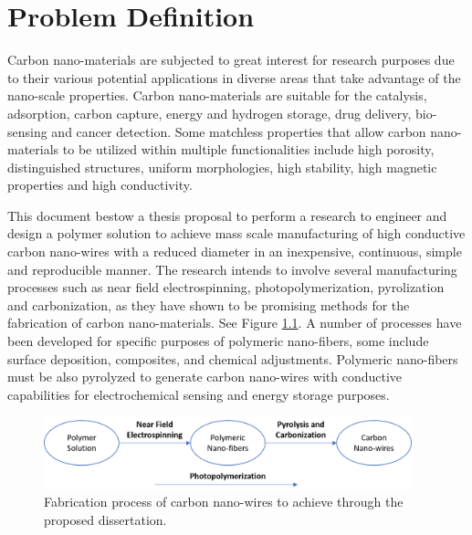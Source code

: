 \chapter{Problem Definition} %

\label{Chapter:ProblemDefinitionandMotivation}

Carbon nano-materials are subjected to great interest for research purposes due to their various potential applications in diverse areas that take advantage of the nano-scale properties. \cite{Siddiqui2019} Carbon nano-materials are suitable for the catalysis, adsorption, carbon capture, energy and hydrogen storage, drug delivery, bio-sensing and cancer detection. \cite{Siddiqui2019} Some matchless properties that allow carbon nano-materials to be utilized within multiple functionalities include high porosity, distinguished structures, uniform morphologies, high stability, high magnetic properties and high conductivity. \cite{Siddiqui2019}

This document bestow a thesis proposal to perform a research to engineer and design a polymer solution to achieve mass scale manufacturing of high conductive carbon nano-wires with a reduced diameter in an inexpensive, continuous, simple and reproducible manner. The research intends to involve several manufacturing processes such as near field electrospinning, photopolymerization, pyrolization and carbonization, as they have shown to be promising methods for the fabrication of carbon nano-materials. \cite{Cardenas2017} See Figure \ref{fig:fabricationFlowChart}. A number of processes have been developed for specific purposes of polymeric nano-fibers, some include surface deposition, composites, and chemical adjustments. Polymeric nano-fibers must be also pyrolyzed to generate carbon nano-wires with conductive capabilities \cite{Madou2011} for electrochemical sensing and energy storage purposes.

\begin{figure}[th]
\centering
\includegraphics[width=0.95\textwidth]{./Figures/FabricationProcess.png}
\decoRule
\caption[Fabrication Process]{Fabrication process of carbon nano-wires to achieve through the proposed dissertation.}
\label{fig:fabricationFlowChart}
\end{figure}

